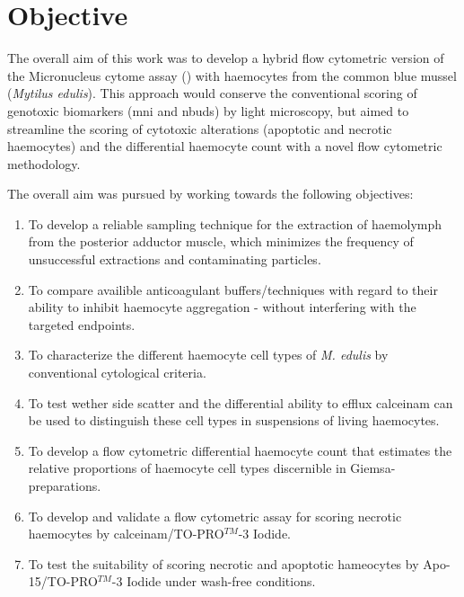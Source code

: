\section{Objective}
The overall aim of this work was to develop a hybrid flow cytometric version of the Micronucleus cytome assay (\cite{Bolognesi2012}) with haemocytes from the common blue mussel (\emph{Mytilus edulis}). This approach would conserve the conventional scoring of genotoxic biomarkers (\acrshort{mni} and \acrshort{nbuds}) by light microscopy, but aimed to streamline the scoring of cytotoxic alterations (apoptotic and necrotic haemocytes) and the differential haemocyte count with a novel flow cytometric methodology. \newline

\noindent The overall aim was pursued by working towards the following objectives:

\begin{enumerate}
    \item To develop a reliable sampling technique for the extraction of haemolymph from the posterior adductor muscle, which minimizes the frequency of unsuccessful extractions and contaminating particles.
    \item To compare availible anticoagulant buffers/techniques with regard to their ability to inhibit haemocyte aggregation - without interfering with the targeted endpoints.
    \item To characterize the different haemocyte cell types of \emph{M. edulis} by conventional cytological criteria.
    \item To test wether side scatter and the differential ability to efflux \acrshort{calceinam} can be used to distinguish these cell types in suspensions of living haemocytes.
    \item To develop a flow cytometric differential haemocyte count that estimates the relative proportions of haemocyte cell types discernible in Giemsa-preparations.
    \item To develop and validate a flow cytometric assay for scoring necrotic haemocytes by \acrshort{calceinam}/TO-PRO$^{TM}$-3 Iodide.
    \item To test the suitability of scoring necrotic and apoptotic hameocytes by Apo-15/TO-PRO$^{TM}$-3 Iodide under wash-free conditions.
\end{enumerate}

